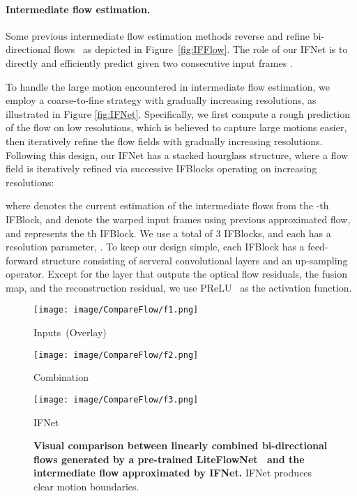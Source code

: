 \documentclass[10pt,twocolumn,letterpaper]{article}
\begin{document}
\paragraph{Intermediate flow estimation.}
Some previous intermediate flow estimation methods reverse and refine bi-directional flows~\cite{jiang2018super, xu2019quadratic, bao2019depth, liu2020enhanced} as depicted in Figure~\ref{fig:IFFlow}. 
The role of our IFNet is to directly and efficiently predict  given two consecutive input frames . 

To handle the large motion encountered in intermediate flow estimation, we employ a coarse-to-fine strategy with gradually increasing resolutions, as illustrated in Figure \ref{fig:IFNet}. Specifically, we first compute a rough prediction of the flow on low resolutions, which is believed to capture large motions easier, then iteratively refine the flow fields with gradually increasing resolutions. Following this design, our IFNet has a stacked hourglass structure, where a flow field is iteratively refined via successive IFBlocks operating on increasing resolutions:



where  denotes the current estimation of the intermediate flows from the -th IFBlock,  and  denote the warped input frames using previous approximated flow, and  represents the th IFBlock. We use a total of 3 IFBlocks, and each has a resolution parameter, . To keep our design simple, each IFBlock has a feed-forward structure consisting of serveral convolutional layers and an up-sampling operator. Except for the layer that outputs the optical flow residuals, the fusion map, and the reconstruction residual, we use PReLU~\cite{he2015delving} as the activation function.



\begin{figure}[t]
	\centering
	\begin{minipage}[t]{0.325\linewidth}
		\centering
		\texttt{[image: image/CompareFlow/f1.png]}
		\centerline{Inputs~(Overlay)}
	\end{minipage}
	\begin{minipage}[t]{0.325\linewidth}
		\centering
		\texttt{[image: image/CompareFlow/f2.png]}
		\centerline{Combination}
	\end{minipage}
	\begin{minipage}[t]{0.325\linewidth}
		\centering
		\texttt{[image: image/CompareFlow/f3.png]}
		\centerline{IFNet}
	\end{minipage}
	
	\caption{\textbf{Visual comparison between linearly combined bi-directional flows generated by a pre-trained LiteFlowNet~\cite{hui2018liteflownet} and the intermediate flow approximated by IFNet.} IFNet produces clear motion boundaries.}
	\label{fig:compare_flow}
	\vspace{-1em}
\end{figure}
\end{document}
